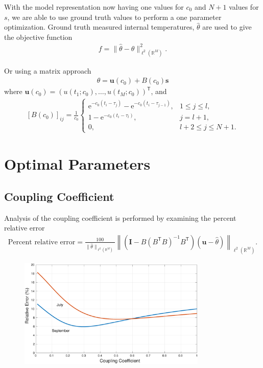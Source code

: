 \documentclass{beamer}
\begin{document}
\begin{frame}
With the model representation now having one values for $c_0$ and
$N+1$ values for $s$, we are able to use ground truth values to
perform a one parameter optimization. Ground truth measured internal temperatures, $\hat{\theta}$ are used to
give the objective function 
\begin{align}
\label{eq:min-f}
    f = \|\hat{\theta} - \theta\|^2_{\ell^2(\mathbb{R}^M)}.
\end{align}
\end{frame}

\begin{frame}

Or using a matrix approach 
\begin{align}
\label{eq:thetavec}
    \theta = \mathbf{u}(c_0) + B(c_0) \mathbf{s}
\end{align}
 where $\mathbf{u}(c_0) = (u(t_1;c_0),\ldots,u(t_M;c_0))^{\textsf{T}}$, and
 \begin{align}
 \label{bdefn}
     [B(c_0)]_{ij} = \frac{1}{c_0}\begin{cases}
     \textrm{e}^{-c_0(t_i-\tau_j)}-\textrm{e}^{-c_0(t_i-\tau_{j-1})}, &
     1 \le j \le l,\\
     1-\textrm{e}^{-c_0(t_i-\tau_l)}, & j = l+1,\\
     0, & l+2 \le j \le N+1.
     \end{cases}
 \end{align} 
\end{frame}

\section{Optimal Parameters}
\subsection{Coupling Coefficient}
\begin{frame}
Analysis of the coupling coefficient is performed by examining the
percent relative error
\begin{align}
\label{myrelerror}
    \textrm{Percent relative error} = 
    \frac{100}{\|\hat{\theta}\|_{\ell^2(\mathbb{R}^M)}}
    \left\|\left(\mathbf{I}- B(B^{\textsf{T}}B)^{-1}B^{\textsf{T}}\right)
    (\mathbf{u}-\hat{\theta})\right\|_{\ell^2(\mathbb{R}^M)}.
\end{align}

\begin{figure}
\includegraphics[width=0.8\textwidth]{Figures/sept_jul_err_n}
\end{figure}
\end{frame}
\end{document}
